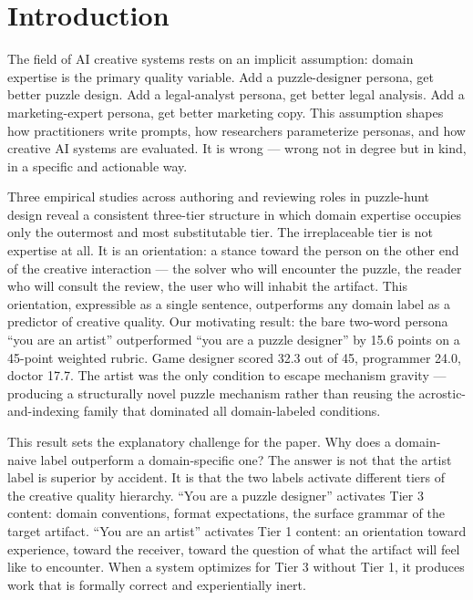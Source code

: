 \section{Introduction}
\label{sec:introduction}

The field of AI creative systems rests on an implicit assumption: domain expertise is
the primary quality variable. Add a puzzle-designer persona, get better puzzle design.
Add a legal-analyst persona, get better legal analysis. Add a marketing-expert persona,
get better marketing copy. This assumption shapes how practitioners write prompts, how
researchers parameterize personas, and how creative AI systems are evaluated. It is
wrong --- wrong not in degree but in kind, in a specific and actionable way.

Three empirical studies across authoring and reviewing roles in puzzle-hunt design
reveal a consistent three-tier structure in which domain expertise occupies only the
outermost and most substitutable tier. The irreplaceable tier is not expertise at all.
It is an orientation: a stance toward the person on the other end of the creative
interaction --- the solver who will encounter the puzzle, the reader who will consult the
review, the user who will inhabit the artifact. This orientation, expressible as a
single sentence, outperforms any domain label as a predictor of creative quality. Our
motivating result: the bare two-word persona ``you are an artist'' outperformed ``you
are a puzzle designer'' by 15.6 points on a 45-point weighted rubric. Game designer
scored 32.3 out of 45, programmer 24.0, doctor 17.7. The artist was the only condition
to escape mechanism gravity --- producing a structurally novel puzzle mechanism rather
than reusing the acrostic-and-indexing family that dominated all domain-labeled
conditions.

This result sets the explanatory challenge for the paper. Why does a domain-naive
label outperform a domain-specific one? The answer is not that the artist label is
superior by accident. It is that the two labels activate different tiers of the
creative quality hierarchy. ``You are a puzzle designer'' activates Tier 3 content:
domain conventions, format expectations, the surface grammar of the target artifact.
``You are an artist'' activates Tier 1 content: an orientation toward experience,
toward the receiver, toward the question of what the artifact will feel like to
encounter. When a system optimizes for Tier 3 without Tier 1, it produces work that
is formally correct and experientially inert.

